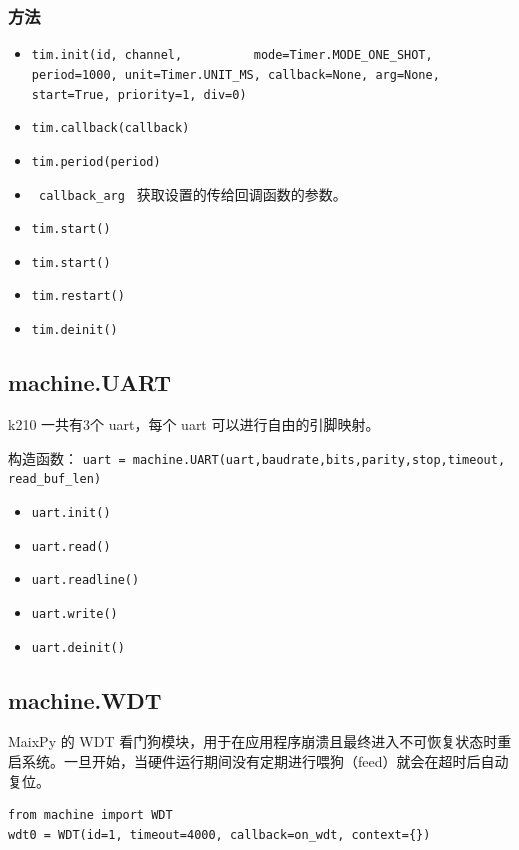 \documentclass[UTF8]{ctexart}
\begin{document}
    \subsubsection{方法}
    \begin{itemize}
        \item \colorbox{mygrey}{\color{myred}\lstinline|tim.init(id, channel, 
        mode=Timer.MODE_ONE_SHOT, period=1000, unit=Timer.UNIT_MS, callback=None, arg=None, 
        start=True, priority=1, div=0)|}
        \item \colorbox{mygrey}{\color{myred}\lstinline|tim.callback(callback)|}
        \item \colorbox{mygrey}{\color{myred}\lstinline|tim.period(period)|}
        \item \colorbox{mygrey}{\color{myred}\lstinline| callback_arg |} 获取设置的传给回调函数的参数。
        \item \colorbox{mygrey}{\color{myred}\lstinline|tim.start()|}
        \item \colorbox{mygrey}{\color{myred}\lstinline|tim.start()|}
        \item \colorbox{mygrey}{\color{myred}\lstinline|tim.restart()|}
        \item \colorbox{mygrey}{\color{myred}\lstinline|tim.deinit()|}
    \end{itemize}
    \subsection{machine.UART}
    k210 一共有3个 uart，每个 uart 可以进行自由的引脚映射。
    \par
    构造函数： \colorbox{mygrey}{\color{myred}\lstinline|uart = machine.UART(uart,baudrate,bits,parity,stop,timeout, read_buf_len)|}
    \begin{itemize}
        \item \colorbox{mygrey}{\color{myred}\lstinline|uart.init()|}
        \item \colorbox{mygrey}{\color{myred}\lstinline|uart.read()|}
        \item \colorbox{mygrey}{\color{myred}\lstinline|uart.readline()|}
        \item \colorbox{mygrey}{\color{myred}\lstinline|uart.write()|}
        \item \colorbox{mygrey}{\color{myred}\lstinline|uart.deinit()|}
    \end{itemize}
    \subsection{machine.WDT}
    MaixPy 的 WDT 看门狗模块，用于在应用程序崩溃且最终进入不可恢复状态时重启系统。一旦开始，当硬件运行期间没有定期进行喂狗（feed）就会在超时后自动复位。
    \begin{lstlisting}
from machine import WDT
wdt0 = WDT(id=1, timeout=4000, callback=on_wdt, context={})
    \end{lstlisting}
\end{document}
